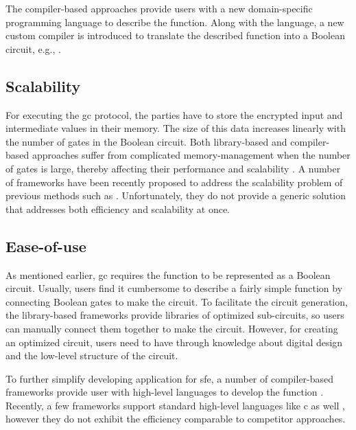 The compiler-based approaches provide users with a new domain-specific programming language to describe the function.
Along with the language, a new custom compiler is introduced to translate the described function into a Boolean circuit, e.g., \cite{malkhi2004fairplay,kreuter2012billion,kreuter2013pcf,franz2014cbmc}.

\subsection{Scalability}

For executing the \acrshort{gc} protocol, the parties have to store the encrypted input and intermediate values in their memory.
The size of this data increases linearly with the number of gates in the Boolean circuit.
Both library-based and compiler-based approaches suffer from complicated memory-management when the number of gates is large, thereby affecting their performance and scalability \cite{henecka2013faster, kreuter2013pcf}.
A number of frameworks have been recently proposed to address the scalability problem of previous methods such as \cite{malka2011vmcrypt, mood2012memory, kreuter2012billion, kreuter2013pcf}.
Unfortunately, they do not provide a generic solution that addresses both efficiency and scalability at once.

\subsection{Ease-of-use}
As mentioned earlier, \acrshort{gc} requires the function to be represented as a Boolean circuit.
Usually, users find it cumbersome to describe a fairly simple function by connecting Boolean gates to make the circuit.
To facilitate the circuit generation, the library-based frameworks provide libraries of optimized sub-circuits, so users can manually connect them together to make the circuit.
However, for creating an optimized circuit, users need to have through knowledge about digital design and the low-level structure of the circuit.

To further simplify developing application for \acrshort{sfe}, a number of compiler-based frameworks provide user with high-level languages to develop the function \cite{mood2012memory,kreuter2012billion,kreuter2013pcf,liu2015oblivm}.
Recently, a few frameworks support standard high-level languages like \gls{c} as well \cite{holzer2012secure, franz2014cbmc, zahur2015obliv, mood2016frigate}, however they do not exhibit the efficiency comparable to competitor approaches.

